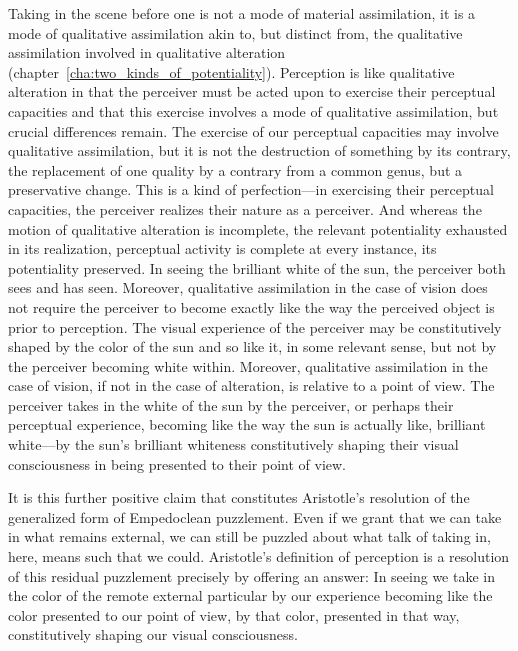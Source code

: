Taking in the scene before one is not a mode of material assimilation, it is a mode of qualitative assimilation akin to, but distinct from, the qualitative assimilation involved in qualitative alteration (chapter~\ref{cha:two_kinds_of_potentiality}). Perception is like qualitative alteration in that the perceiver must be acted upon to exercise their perceptual capacities and that this exercise involves a mode of qualitative assimilation, but crucial differences remain. The exercise of our perceptual capacities may involve qualitative assimilation, but it is not the destruction of something by its contrary, the replacement of one quality by a contrary from a common genus, but a preservative change. This is a kind of perfection---in exercising their perceptual capacities, the perceiver realizes their nature as a perceiver. And whereas the motion of qualitative alteration is incomplete, the relevant potentiality exhausted in its realization, perceptual activity is complete at every instance, its potentiality preserved. In seeing the brilliant white of the sun, the perceiver both sees and has seen. Moreover, qualitative assimilation in the case of vision does not require the perceiver to become exactly like the way the perceived object is prior to perception. The visual experience of the perceiver may be constitutively shaped by the color of the sun and so like it, in some relevant sense, but not by the perceiver becoming white within. Moreover, qualitative assimilation in the case of vision, if not in the case of alteration, is relative to a point of view. The perceiver takes in the white of the sun by the perceiver, or perhaps their perceptual experience, becoming like the way the sun is actually like, brilliant white---by the sun's brilliant whiteness constitutively shaping their visual consciousness in being presented to their point of view.

It is this further positive claim that constitutes Aristotle's resolution of the generalized form of Empedoclean puzzlement. Even if we grant that we can take in what remains external, we can still be puzzled about what talk of taking in, here, means such that we could. Aristotle's definition of perception is a resolution of this residual puzzlement precisely by offering an answer: In seeing we take in the color of the remote external particular by our experience becoming like the color presented to our point of view, by that color, presented in that way, constitutively shaping our visual consciousness.

